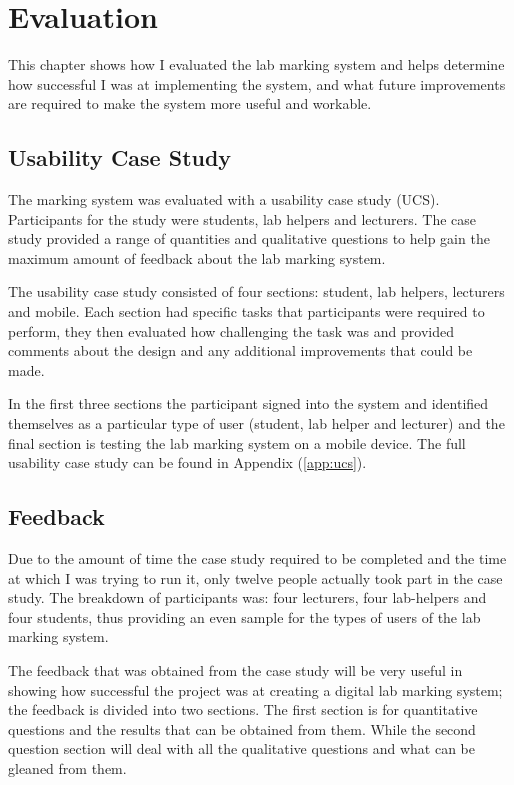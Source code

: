 \documentclass[11pt]{report}
\begin{document}
\newpage
\chapter{Evaluation} \label{sec:eval}

This chapter shows how I evaluated the lab marking system and helps determine how successful I was at implementing the system, and what future improvements are required to make the system more useful and workable. 

\section{Usability Case Study}
The marking system was evaluated with a usability case study (UCS). Participants for the study were students, lab helpers and lecturers. The case study provided a range of quantities and qualitative questions to help gain the maximum amount of feedback about the lab marking system. 


The usability case study consisted of four sections: student, lab helpers, lecturers and mobile. Each section had specific tasks that participants were required to perform, they then evaluated how challenging the task was and provided comments about the design and any additional improvements that could be made. 

In the first three sections the participant signed into the system  and identified themselves as a particular type of user (student, lab helper and lecturer) and the final section is testing the lab marking system on a mobile device. The full usability case study can be found in Appendix (\ref{app:ucs}).

\section{Feedback}

Due to the amount of time the case study required to be completed and the time at which I was trying to run it, only twelve people actually took part in the case study. The breakdown of participants was: four lecturers, four lab-helpers and four students, thus providing an even sample for the types of users of the lab marking system.

The feedback that was obtained from the case study will be very useful in showing how successful the project was at creating a digital lab marking system; the feedback is divided into two sections. The first section is for  quantitative questions and the results that can be obtained from them. While the second question section will deal with all the qualitative questions and what can be gleaned from them. 
\end{document}
